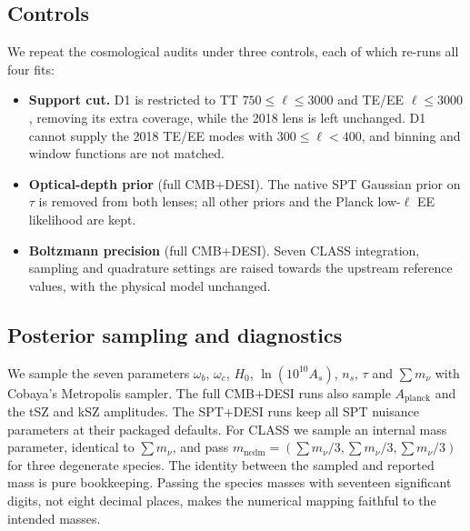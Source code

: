 \documentclass[11pt]{article}
\theoremstyle{remark}
\newcommand{\mnu}{\sum m_\nu}
\numberwithin{equation}{section}
\begin{document}
\subsection{Controls}
\label{sec:common-staging}
We repeat the cosmological audits under three controls, each of which re-runs all four fits:
\begin{itemize}[leftmargin=*, itemsep=2pt]
  \item \textbf{Support cut.} D1 is restricted to TT $750\le\ell\le3000$ and TE/EE $\ell\le3000$, removing its extra coverage, while the 2018 lens is left unchanged. D1 cannot supply the 2018 TE/EE modes with $300\le\ell<400$, and binning and window functions are not matched.
  \item \textbf{Optical-depth prior} (full CMB+DESI). The native SPT Gaussian prior on $\tau$ is removed from both lenses; all other priors and the Planck low-$\ell$ EE likelihood are kept.
  \item \textbf{Boltzmann precision} (full CMB+DESI). Seven CLASS integration, sampling and quadrature settings are raised towards the upstream reference values, with the physical model unchanged.
\end{itemize}

\subsection{Posterior sampling and diagnostics}
\label{sec:mnu-inference}

We sample the seven parameters $\omega_b$, $\omega_c$, $H_0$, $\ln(10^{10}A_s)$, $n_s$, $\tau$ and $\mnu$ with Cobaya's Metropolis sampler. The full CMB+DESI runs also sample $A_{\mathrm{planck}}$ and the tSZ and kSZ amplitudes. The SPT+DESI runs keep all SPT nuisance parameters at their packaged defaults. For CLASS we sample an internal mass parameter, identical to $\mnu$, and pass $m_{\mathrm{ncdm}}=(\mnu/3,\mnu/3,\mnu/3)$ for three degenerate species. The identity between the sampled and reported mass is pure bookkeeping. Passing the species masses with seventeen significant digits, not eight decimal places, makes the numerical mapping faithful to the intended masses.
\end{document}

